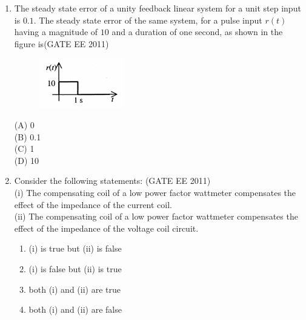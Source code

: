 \documentclass[a4paper,10pt]{exam}
\theoremstyle{remark}
\begin{document}
\begin{enumerate}
The gain margin and phase margin of the system are \hfill{(GATE EE 2011)}

\begin{multicols}{4}
(A) 6 dB and $30^\circ$ \\
(B) 6 dB and $-30^\circ$ \\
(C) $-6$ dB and $30^\circ$ \\
(D) $-6$ dB and $-30^\circ$ 
\end{multicols}

\vspace{1em}

\item \quad The steady state error of a unity feedback linear system for a unit step input is $0.1$. The steady state error of the same system, for a pulse input $r(t)$ having a magnitude of $10$ and a duration of one second, as shown in the figure is\hfill{(GATE EE 2011)}


\begin{figure}[H]
        \centering
        \includegraphics[width=0.2\columnwidth]{figs/Q 9.png}
        \caption{}
        \label{fig:placeholder}
    \end{figure}




\begin{multicols}{4}
(A) 0 \\
(B) 0.1 \\
(C) 1 \\
(D) 10 
\end{multicols}


\vspace{1em}

\item \quad Consider the following statements: \hfill{(GATE EE 2011)}\\
(i) The compensating coil of a low power factor wattmeter compensates the effect of the impedance of the current coil.\\
 (ii) The compensating coil of a low power factor wattmeter compensates the effect of the impedance of the voltage coil circuit.

\begin{multicols}{2}
\begin{enumerate}
     \item (i) is true but (ii) is false 
\item (i) is false but (ii) is true
\item both (i) and (ii) are true
\item both (i) and (ii) are false
\end{enumerate}
\end{multicols}


\end{enumerate}
\end{document}
